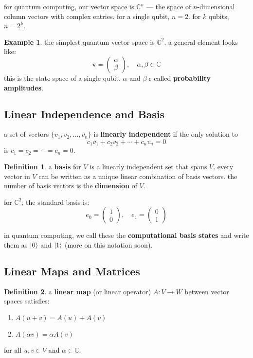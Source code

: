 \documentclass[11pt,a4paper]{article}
\theoremstyle{definition}
\newtheorem{definition}{Definition}[section]
\newtheorem{example}{Example}[section]
\theoremstyle{remark}
\begin{document}
for quantum computing, our vector space is $\mathbb{C}^n$ --- the space of $n$-dimensional column vectors with complex entries. for a single qubit, $n = 2$. for $k$ qubits, $n = 2^k$.

\begin{example}
the simplest quantum vector space is $\mathbb{C}^2$. a general element looks like:
\[
\mathbf{v} = \begin{pmatrix} \alpha \\ \beta \end{pmatrix}, \quad \alpha, \beta \in \mathbb{C}
\]
this is the state space of a single qubit. $\alpha$ and $\beta$ r called \textbf{probability amplitudes}.
\end{example}

\subsection{Linear Independence and Basis}

a set of vectors $\{v_1, v_2, \ldots, v_n\}$ is \textbf{linearly independent} if the only solution to
\[
c_1 v_1 + c_2 v_2 + \cdots + c_n v_n = 0
\]
is $c_1 = c_2 = \cdots = c_n = 0$.

\begin{definition}
a \textbf{basis} for $V$ is a linearly independent set that spans $V$. every vector in $V$ can be written as a unique linear combination of basis vectors. the number of basis vectors is the \textbf{dimension} of $V$.
\end{definition}

for $\mathbb{C}^2$, the standard basis is:
\[
e_0 = \begin{pmatrix} 1 \\ 0 \end{pmatrix}, \quad e_1 = \begin{pmatrix} 0 \\ 1 \end{pmatrix}
\]

in quantum computing, we call these the \textbf{computational basis states} and write them as $\ket{0}$ and $\ket{1}$ (more on this notation soon).

\subsection{Linear Maps and Matrices}

\begin{definition}
a \textbf{linear map} (or linear operator) $A: V \to W$ between vector spaces satisfies:
\begin{enumerate}[label=(\roman*)]
    \item $A(u + v) = A(u) + A(v)$
    \item $A(\alpha v) = \alpha A(v)$
\end{enumerate}
for all $u, v \in V$ and $\alpha \in \mathbb{C}$.
\end{definition}
\end{document}
